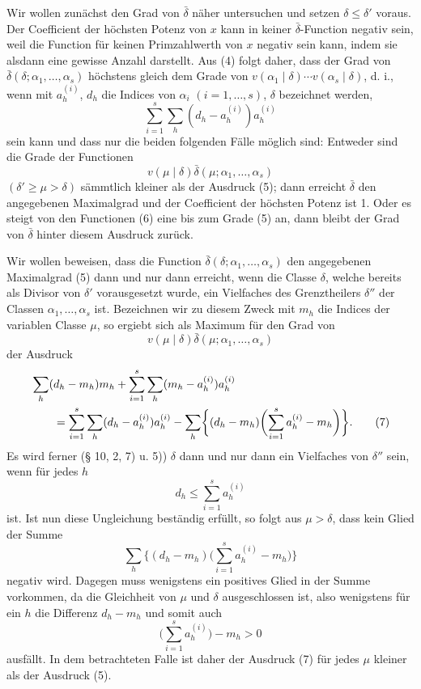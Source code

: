 Wir wollen zunächst den Grad von $\bar\delta$ näher untersuchen und setzen $\delta\le\delta'$ voraus. Der Coefficient der höchsten Potenz von $x$ kann in keiner $\bar\delta$-Function negativ sein, weil die Function für keinen Primzahlwerth von $x$ negativ sein kann, indem sie alsdann eine gewisse Anzahl darstellt. Aus (4) folgt daher, dass der Grad von $\bar\delta(\delta;\alpha_1,\ldots,
\alpha_s)$ höchstens gleich dem Grade von $v(\alpha_1\mid\delta)\cdots v(\alpha_s\mid\delta)$, d. i., wenn mit $a_h^{(i)}$, $d_h$ die Indices von $\alpha_i$ $(i=1,
\ldots,s)$, $\delta$ bezeichnet werden,
\begin{equation}
 \sum_{i=1}^s\sum_h(d_h-a_h^{(i)})a_h^{(i)}
\tag{5}
\end{equation}
sein kann und dass nur die beiden folgenden Fälle möglich sind: Entweder sind die Grade der Functionen
\begin{equation}
 v(\mu\mid\delta)\bar\delta(\mu;\alpha_1,\ldots,\alpha_s)
\tag{6}
\end{equation}
$(\delta'\ge\mu>\delta)$ sämmtlich kleiner als der Ausdruck (5); dann erreicht $\bar\delta$ den angegebenen Maximalgrad und der Coefficient der höchsten Potenz ist 1. Oder es steigt von den Functionen (6) eine bis zum Grade (5) an, dann bleibt der Grad von $\bar\delta$ hinter diesem Ausdruck zurück.

Wir wollen beweisen, dass die Function $\bar\delta(\delta;\alpha_1,
\ldots,\alpha_s)$ den angegebenen Maximalgrad (5) dann und nur dann erreicht, wenn die Classe $\delta$, welche bereits als Divisor von $\delta'$ vorausgesetzt wurde, ein Vielfaches des Grenztheilers $\delta''$ der Classen $\alpha_1,
\ldots,\alpha_s$ ist. Bezeichnen wir zu diesem Zweck mit $m_h$ die Indices der variablen Classe $\mu$, so ergiebt sich als Maximum für den Grad von
\[
 v(\mu\mid\delta)\bar\delta(\mu;\alpha_1,\ldots,\alpha_s)
\]
der Ausdruck
\begin{align}
&\sum_h(d_h-m_h)m_h+\sum_{i=1}^s\sum_h(m_h-a_h^{(i)})a_h^{(i)} \notag\\
&\qquad =\sum_{i=1}^s\sum_h(d_h-a_h^{(i)})a_h^{(i)}
 -\sum_h\biggl\{(d_h-m_h)\biggl(\sum_{i=1}^s a_h^{(i)}-m_h\biggr)\biggr\}.
\tag{7}
\end{align}
Es wird ferner (§ 10, 2, 7) u. 5)) $\delta$ dann und nur dann ein Vielfaches von $\delta''$ sein, wenn für jedes $h$
\begin{equation}
 d_h\le\sum_{i=1}^s a_h^{(i)}
\tag{8}
\end{equation}
ist. Ist nun diese Ungleichung beständig erfüllt, so folgt aus $\mu>\delta$, dass kein Glied der Summe
\begin{equation}
 \sum_h\biggl\{(d_h-m_h)\biggl(\sum_{i=1}^s a_h^{(i)}-m_h\biggr)\biggr\}
\tag{9}
\end{equation}
negativ wird. Dagegen muss wenigstens ein positives Glied in der Summe vorkommen, da die Gleichheit von $\mu$ und $\delta$ ausgeschlossen ist, also wenigstens für ein $h$ die Differenz $d_h-m_h$ und somit auch
\[
 \biggl(\sum_{i=1}^s a_h^{(i)}\biggr)-m_h>0
\]
ausfällt. In dem betrachteten Falle ist daher der Ausdruck (7) für jedes $\mu$ kleiner als der Ausdruck (5).

